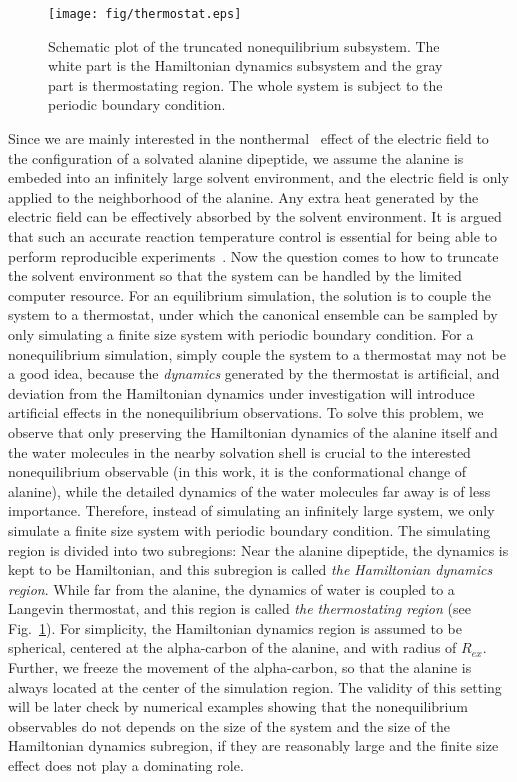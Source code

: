 \documentclass[aip,jcp,a4paper,preprint,onecolumn]{revtex4-1}
\begin{document}
\begin{figure}
  \centering
  \texttt{[image: fig/thermostat.eps]}
  \caption{Schematic plot of the truncated nonequilibrium subsystem.
    The white part is the Hamiltonian dynamics subsystem
    and the gray part is thermostating region. The whole system
    is subject to the periodic boundary condition.}
  \label{fig:tmp2}
\end{figure}

Since we are mainly interested in the
nonthermal~\cite{delaHoz2005microwaves} effect of the electric field
to the configuration of a solvated alanine dipeptide, we assume the
alanine is embeded into an infinitely large solvent environment, and
the electric field is only applied to the neighborhood of the alanine.
Any extra heat generated by the electric field can be effectively
absorbed by the solvent environment.  It is argued that such an
accurate reaction temperature control is essential for being able to
perform reproducible experiments~\cite{damm2012can}.
Now the question comes to how to truncate the solvent environment
so that the system can be handled by the limited computer resource.
For an equilibrium simulation, the solution is to couple
the system to a thermostat, under which the canonical ensemble can be
sampled by only simulating a finite size system with periodic boundary
condition. For a nonequilibrium simulation, simply couple the system
to a thermostat may not be a good idea, because the \emph{dynamics}
generated by the thermostat is artificial, and deviation from the
Hamiltonian dynamics under investigation will introduce artificial
effects in the nonequilibrium observations. To solve this problem, we
observe that only preserving the Hamiltonian dynamics of the alanine 
itself and the water molecules in the nearby solvation shell is
crucial to the interested nonequilibrium observable
(in this work, it is the conformational change of alanine),
while the detailed dynamics of
the water molecules far away is of less importance. 
Therefore, instead of simulating an infinitely
large system, we only simulate a finite size system with periodic
boundary condition. The simulating region is divided into two
subregions: Near the alanine dipeptide, the dynamics is kept to be
Hamiltonian, and this subregion is called \emph{the Hamiltonian dynamics
region}. While far from the alanine, the dynamics of water is coupled
to a Langevin thermostat, and this region is called \emph{the thermostating
region} (see Fig.~\ref{fig:tmp2}).  For simplicity, the Hamiltonian
dynamics region is assumed to be spherical, centered at the
alpha-carbon of the alanine, and with radius of $R_{ex}$.  Further, we
freeze the movement of the alpha-carbon, so that the alanine is always
located at the center of the simulation region.  The validity of this
setting will be later check by numerical examples showing that the
nonequilibrium observables do not depends on the size of the system
and the size of the Hamiltonian dynamics subregion, if they are
reasonably large and the finite size effect does not play a dominating role.
\end{document}
